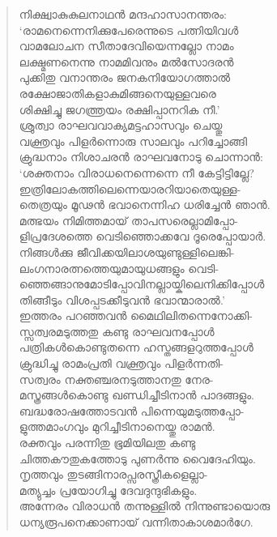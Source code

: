 \begin{verse}
നിക്ഷ്വാകുകുലനാഥന്‍ മന്ദഹാസാനന്തരം:\\
‘രാമനെന്നെനിക്കുപേരെന്നുടെ പത്നിയിവള്‍\\
വാമലോചന സീതാദേവിയെന്നല്ലോ നാമം\\
ലക്ഷ്മണനെന്നു നാമമിവനും മല്‍സോദരന്‍\\
പുക്കിതു വനാന്തരം ജനകനിയോഗത്താല്‍\\
രക്ഷോജാതികളാകുമിങ്ങനെയുള്ളവരെ\\
ശിക്ഷിച്ചു ജഗത്ത്രയം രക്ഷിപ്പാനറിക നീ.’\\
ശ്രുത്വാ രാഘവവാക്യമട്ടഹാസവും ചെയ്തു\\
വക്ത്രവും പിളര്‍ന്നൊരു സാലവും പറിച്ചോങ്ങി\\
ക്രുദ്ധനാം നിശാചരന്‍ രാഘവനോടു ചൊന്നാന്‍:\\
‘ശക്തനാം വിരാധനെന്നെന്നെ നീ കേട്ടിട്ടില്ലേ?\\
ഇത്രിലോകത്തിലെന്നെയാരറിയാതെയുള്ള-\\
തെത്രയും മൂഢന്‍ ഭവാനെന്നിഹ ധരിച്ചേന്‍ ഞാന്‍.\\
മത്ഭയം നിമിത്തമായ് താപസരെല്ലാമിപ്പോ-\\
ളിപ്രദേശത്തെ വെടിഞ്ഞൊക്കവേ ദൂരെപ്പോയാര്‍.\\
നിങ്ങള്‍ക്കു ജീവിക്കയിലാശയുണ്ടുള്ളിലെങ്കി-\\
ലംഗനാരത്നത്തെയുമായുധങ്ങളും വെടി-\\
ഞ്ഞെങ്ങാനുമോടിപ്പോവിനല്ലായ്കിലെനിക്കിപ്പോള്‍\\
തിങ്ങീടും വിശപ്പടക്കീടുവന്‍ ഭവാന്മാരാല്‍.’\\
ഇത്തരം പറഞ്ഞവന്‍ മൈഥിലിതന്നെനോക്കി-\\
സ്സത്വരമടുത്തതു കണ്ടു രാഘവനപ്പോള്‍\\
പത്രികള്‍കൊണ്ടുതന്നെ ഹസ്തങ്ങളറുത്തപ്പോള്‍\\
ക്രുദ്ധിച്ചു രാമംപ്രതി വക്ത്രവും പിളര്‍ന്നതി-\\
സത്വരം നക്തഞ്ചരനടുത്താനതു നേര-\\
മസ്ത്രങ്ങള്‍കൊണ്ടു ഖണ്ഡിച്ചീടിനാന്‍ പാദങ്ങളും.\\
ബദ്ധരോഷത്തോടവന്‍ പിന്നെയുമടുത്തപ്പോ-\\
ളുത്തമാംഗവും മുറിച്ചീടിനാനെയ്തു രാമന്‍.\\
രക്തവും പരന്നിതു ഭൂമിയിലതു കണ്ടു\\
ചിത്തകൗതുകത്തോടു പുണര്‍ന്നു വൈദേഹിയും.\\
നൃത്തവും തുടങ്ങിനാരപ്സരസ്ത്രീകളെല്ലാ-\\
മത്യുച്ചം പ്രയോഗിച്ചു ദേവദുന്ദുഭികളും.\\
അന്നേരം വിരാധന്‍ തന്നുള്ളില്‍ നിന്നുണ്ടായൊരു\\
ധന്യരൂപനെക്കാണായ് വന്നിതാകാശമാര്‍ഗേ.\\

\end{verse}
